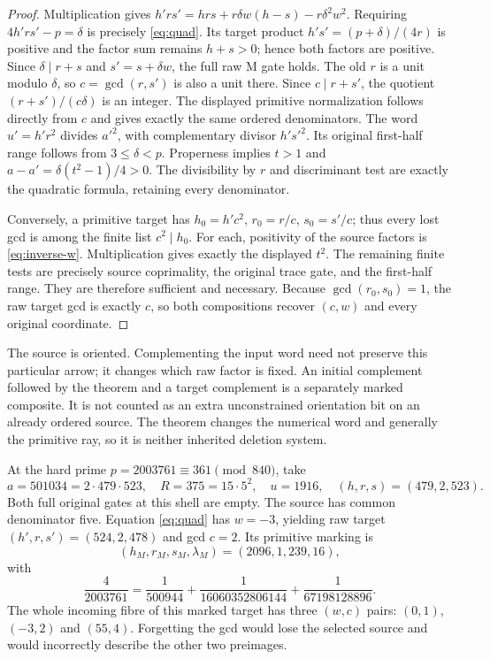 \begin{proof}
Multiplication gives
$h'rs'=hrs+r\delta w(h-s)-r\delta^2w^2$.
Requiring $4h'rs'-p=\delta$ is precisely \eqref{eq:quad}.
Its target product $h's'=(p+\delta)/(4r)$ is positive and the factor sum
remains $h+s>0$; hence both factors are positive.
Since $\delta\mid r+s$ and $s'=s+\delta w$, the full raw M gate holds.
The old $r$ is a unit modulo $\delta$, so $c=\gcd(r,s')$ is also a unit there.
Since $c\mid r+s'$, the quotient $(r+s')/(c\delta)$ is an integer.
The displayed primitive normalization follows directly from $c$ and gives
exactly the same ordered denominators. The word $u'=h'r^2$ divides $a'^2$,
with complementary divisor $h's'^2$. Its original first-half range follows
from $3\le\delta<p$. Properness implies $t>1$ and
$a-a'=\delta(t^2-1)/4>0$.
The divisibility by $r$ and discriminant test are exactly the quadratic
formula, retaining every denominator.

Conversely, a primitive target has $h_0=h'c^2$, $r_0=r/c$, $s_0=s'/c$;
thus every lost gcd is among the finite list $c^2\mid h_0$.
For each, positivity of the source factors is \eqref{eq:inverse-w}.
Multiplication gives exactly the displayed $t^2$.
The remaining finite tests are precisely source coprimality, the original
trace gate, and the first-half range. They are therefore sufficient and
necessary. Because $\gcd(r_0,s_0)=1$, the raw target gcd is exactly $c$,
so both compositions recover $(c,w)$ and every original coordinate.
\end{proof}

The source is oriented. Complementing the input word need not preserve this
particular arrow; it changes which raw factor is fixed. An initial
complement followed by the theorem and a target complement is a separately
marked composite. It is not counted as an extra unconstrained orientation
bit on an already ordered source. The theorem changes the numerical word
and generally the primitive ray, so it is neither inherited deletion system.

At the hard prime $p=2003761\equiv361\pmod{840}$, take
\[
 a=501034=2\cdot479\cdot523,\quad R=375=15\cdot5^2,
 \quad u=1916,\quad(h,r,s)=(479,2,523).
\]
Both full original gates at this shell are empty. The source has common
denominator five. Equation \eqref{eq:quad} has $w=-3$, yielding raw target
$(h',r,s')=(524,2,478)$ and gcd $c=2$. Its primitive marking is
\[
 (h_M,r_M,s_M,\lambda_M)=(2096,1,239,16),
\]
with
\[
 \frac4{2003761}
 =\frac1{500944}+\frac1{16060352806144}+\frac1{67198128896}.
\]
The whole incoming fibre of this marked target has three $(w,c)$ pairs:
$(0,1)$, $(-3,2)$ and $(55,4)$. Forgetting the gcd would lose the selected
source and would incorrectly describe the other two preimages.


